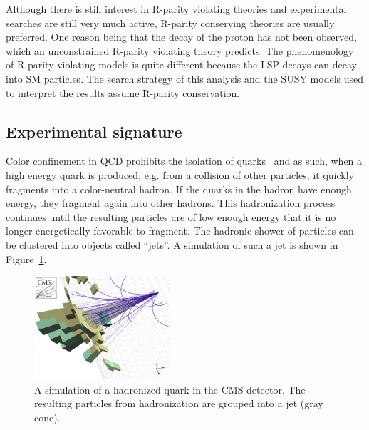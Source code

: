 Although there is still interest in R-parity violating theories and experimental searches are still
very much active, R-parity conserving theories are usually preferred. One reason being that the decay of 
the proton has not been observed, which an unconstrained R-parity violating theory predicts. The 
phenomenology of R-parity violating models is quite different because the LSP decays can decay into SM 
particles. The search strategy of this analysis and the SUSY models used to interpret the results assume 
R-parity conservation.

\subsection{Experimental signature}
\label{sec:signature}

Color confinement in QCD prohibits the isolation of quarks~\cite{Ellis:1991qj} 
and as such, when a high energy quark is produced, e.g. 
from a collision of other particles, it quickly fragments into a 
color-neutral hadron. If the quarks in the hadron have enough energy, 
they fragment again into other hadrons. This hadronization process 
continues until the resulting particles are of low enough energy that it
is no longer energetically favorable to fragment. The hadronic shower of
particles can be clustered into objects called ``jets''. A simulation 
of such a jet is shown in Figure~\ref{fig:jets}.  

\begin{figure}[h!t]
  \begin{center}
       \includegraphics[width=0.45\textwidth,]{figures/JetConeAndPFJet.png}
       \caption{A simulation of a hadronized quark in the CMS detector. The
       resulting particles from hadronization are grouped into a jet (gray cone). }
    \label{fig:jets}
  \end{center}
\end{figure}

